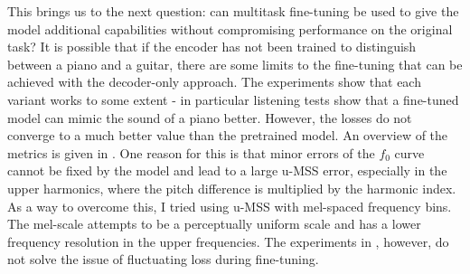 This brings us to the next question: can multitask fine-tuning be used to give the model additional capabilities without compromising performance on the original task? It is possible that if the encoder has not been trained to distinguish between a piano and a guitar, there are some limits to the fine-tuning that can be achieved with the decoder-only approach.\newline
The experiments show that each variant works to some extent - in particular listening tests show that a fine-tuned model can mimic the sound of a piano better. However, the losses do not converge to a much better value than the pretrained model. An overview of the metrics is given in . \newline
One reason for this is that minor errors of the $f_0$ curve cannot be fixed by the model and lead to a large u-MSS error, especially in the upper harmonics, where the pitch difference is multiplied by the harmonic index. As a way to overcome this, I tried using u-MSS with mel-spaced frequency bins. The mel-scale attempts to be a perceptually uniform scale and has a lower frequency resolution in the upper frequencies. The experiments in , however, do not solve the issue of fluctuating loss during fine-tuning. \newline




